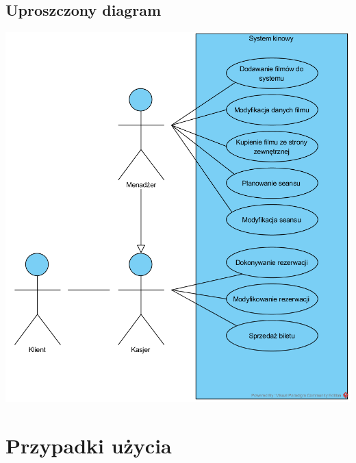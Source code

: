 \documentclass{article}
\begin{document}
	\subsection{Uproszczony diagram}
	\begin{center}
		\includegraphics[scale=0.8, center]{UC-1}
	\end{center}
	
	\newpage
	\section{Przypadki użycia}
	
\end{document}
